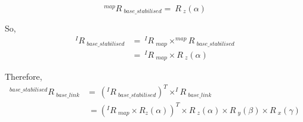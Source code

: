 \documentclass{article}
\begin{document}
\begin{equation}
^{map}R\ _{base\_stabilised} =\ R\ _z(\alpha) 
\end{equation}

So,
\begin{align}
^{I}R\ _{base\_stabilised} & =\ ^{I}R\ _{map} \times ^{map}R\ _{base\_stabilised}\\
 & =\ ^{I}R\ _{map} \times R\ _z(\alpha) 
\end{align}

Therefore,
\begin{align}
^{base\_stabilised}R\ _{base\_link} &=\ (^{I}R\ _{base\_stabilised})^T \times ^{I}R\ _{base\_link}\\
 &\ = (^{I}R\ _{map} \times R_z(\alpha))^T \times R\ _z(\alpha) \times R\ _y(\beta) \times R\ _x(\gamma) 
\end{align}
\end{document}
